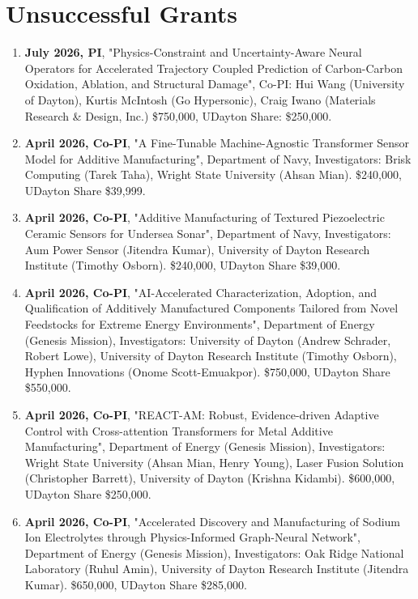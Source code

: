 \documentclass[11pt, letterpaper]{article}
\begin{document}
\section{Unsuccessful Grants}
    \begin{enumerate}[label=\arabic*., itemsep=-1pt, topsep=2pt]
        \item \textbf{July 2026, PI}, "Physics-Constraint and Uncertainty-Aware Neural Operators for Accelerated Trajectory Coupled Prediction of Carbon-Carbon Oxidation, Ablation, and Structural Damage", Co-PI: Hui Wang (University of Dayton), Kurtis McIntosh (Go Hypersonic), Craig Iwano (Materials Research \& Design, Inc.) \$750,000, UDayton Share: \$250,000.
        \item \textbf{April 2026, Co-PI}, "A Fine-Tunable Machine-Agnostic Transformer Sensor Model for Additive Manufacturing", Department of Navy, Investigators: Brisk Computing (Tarek Taha), Wright State University (Ahsan Mian). \$240,000, UDayton Share \$39,999.
        \item \textbf{April 2026, Co-PI}, "Additive Manufacturing of Textured Piezoelectric Ceramic Sensors for Undersea Sonar", Department of Navy, Investigators: Aum Power Sensor (Jitendra Kumar), University of Dayton Research Institute (Timothy Osborn). \$240,000, UDayton Share \$39,000.
        \item \textbf{April 2026, Co-PI}, "AI-Accelerated Characterization, Adoption, and Qualification of Additively Manufactured Components Tailored from Novel Feedstocks for Extreme Energy Environments", Department of Energy (Genesis Mission), Investigators: University of Dayton (Andrew Schrader, Robert Lowe), University of Dayton Research Institute (Timothy Osborn), Hyphen Innovations (Onome Scott-Emuakpor). \$750,000, UDayton Share \$550,000.
        \item \textbf{April 2026, Co-PI}, "REACT-AM: Robust, Evidence-driven Adaptive Control with Cross-attention Transformers for Metal Additive Manufacturing", Department of Energy (Genesis Mission), Investigators: Wright State University (Ahsan Mian, Henry Young), Laser Fusion Solution (Christopher Barrett), University of Dayton (Krishna Kidambi). \$600,000, UDayton Share \$250,000. 
        \item \textbf{April 2026, Co-PI}, "Accelerated Discovery and Manufacturing of Sodium Ion Electrolytes through Physics-Informed Graph-Neural Network", Department of Energy (Genesis Mission), Investigators: Oak Ridge National Laboratory (Ruhul Amin), University of Dayton Research Institute (Jitendra Kumar). \$650,000, UDayton Share \$285,000. 

\end{enumerate}
\end{document}
